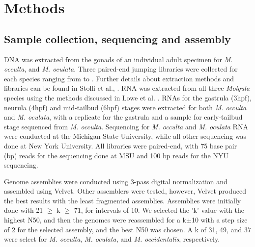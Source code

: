 \section{Methods}
\subsection{Sample collection, sequencing and assembly}
DNA was extracted from the gonads of an individual adult specimen for %
\textit{M. occulta}, and \textit{M. oculata}. Three paired-end jumping libraries were collected for each species ranging from  to . Further details about extraction methods and libraries can be found in Stolfi et al., \cite{stolfi_divergent_2014}. RNA was extracted from all three \textit{Molgula} species using the methods discussed in Lowe et al. \cite{lowe_evaluating_2014}. RNAs for the gastrula (3hpf), neurula (4hpf) and mid-tailbud (6hpf) stages were extracted for both \textit{M. occulta} and \textit{M. oculata}, with a replicate for the gastrula and a sample for early-tailbud stage sequenced from \textit{M. occulta}. %
Sequencing for \textit{M. occulta} and \textit{M. oculata} RNA were conducted at the Michigan State University, while all other sequencing was done at New York University. All libraries were paired-end, with 75 base pair (bp) reads for the sequencing done at MSU and 100 bp reads for the NYU sequencing. 

Genome assemblies were conducted using 3-pass digital normalization \cite{brown_reference-free_2012} and assembled using Velvet\cite{zerbino_velvet:_2008}. Other assemblers were tested, however, Velvet produced the best results with the least fragmented assemblies. Assemblies were initially done with 21 $\geq$ k $\geq$ 71, for intervals of 10. We selected the 'k' value with the highest N50, and then the genomes were reassembled for a k$\pm$10 with a step size of 2 for the selected assembly, and the best N50 was chosen. A k of 31, 49, and 37 were select for \textit{M. occulta}, \textit{M. oculata}, and \textit{M. occidentalis}, respectively. 

